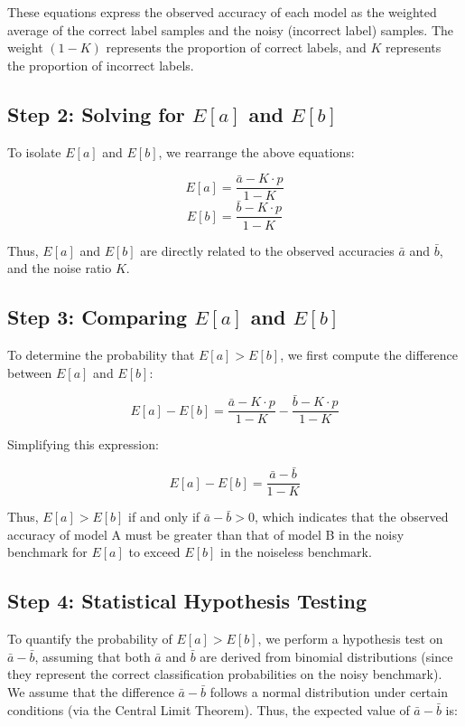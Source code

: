 These equations express the observed accuracy of each model as the weighted average of the correct label samples and the noisy (incorrect label) samples. The weight \( (1 - K) \) represents the proportion of correct labels, and \( K \) represents the proportion of incorrect labels.

\subsection*{Step 2: Solving for \( E[a] \) and \( E[b] \)}

To isolate \( E[a] \) and \( E[b] \), we rearrange the above equations:

\[
E[a] = \frac{\bar{a} - K \cdot p}{1 - K}
\]
\[
E[b] = \frac{\bar{b} - K \cdot p}{1 - K}
\]

Thus, \( E[a] \) and \( E[b] \) are directly related to the observed accuracies \( \bar{a} \) and \( \bar{b} \), and the noise ratio \( K \).

\subsection*{Step 3: Comparing \( E[a] \) and \( E[b] \)}

To determine the probability that \( E[a] > E[b] \), we first compute the difference between \( E[a] \) and \( E[b] \):

\[
E[a] - E[b] = \frac{\bar{a} - K \cdot p}{1 - K} - \frac{\bar{b} - K \cdot p}{1 - K}
\]

Simplifying this expression:

\[
E[a] - E[b] = \frac{\bar{a} - \bar{b}}{1 - K}
\]

Thus, \( E[a] > E[b] \) if and only if \( \bar{a} - \bar{b} > 0 \), which indicates that the observed accuracy of model A must be greater than that of model B in the noisy benchmark for \( E[a] \) to exceed \( E[b] \) in the noiseless benchmark.

\subsection*{Step 4: Statistical Hypothesis Testing}

To quantify the probability of \( E[a] > E[b] \), we perform a hypothesis test on \( \bar{a} - \bar{b} \), assuming that both \( \bar{a} \) and \( \bar{b} \) are derived from binomial distributions (since they represent the correct classification probabilities on the noisy benchmark). We assume that the difference \( \bar{a} - \bar{b} \) follows a normal distribution under certain conditions (via the Central Limit Theorem). Thus, the expected value of \( \bar{a} - \bar{b} \) is:

